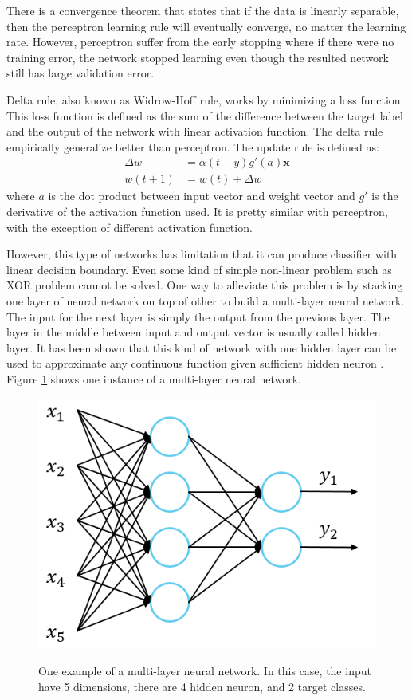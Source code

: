 \documentclass[a4paper,11pt]{kth-mag}
\begin{document}
There is a convergence theorem that states that if the data is linearly separable, then the perceptron learning rule will eventually converge, no matter the learning rate. However, perceptron suffer from the early stopping where if there were no training error, the network stopped learning even though the resulted network still has large validation error.

Delta rule, also known as Widrow-Hoff rule, works by minimizing a loss function. This loss function is defined as the sum of the difference between the target label and the output of the network with linear activation function. The delta rule empirically generalize better than perceptron. The update rule is defined as:
\begin{equation}
\begin{split}
\Delta w & = \alpha (t-y) g'(a) \bm{x} \\
w(t+1) & = w(t) + \Delta w
\end{split}
\end{equation}
where $a$ is the dot product between input vector and weight vector and $g'$ is the derivative of the activation function used. It is pretty similar with perceptron, with the exception of different activation function.

However, this type of networks has limitation that it can produce classifier with linear decision boundary. Even some kind of simple non-linear problem such as XOR problem cannot be solved. One way to alleviate this problem is by stacking one layer of neural network on top of other to build a multi-layer neural network. The input for the next layer is simply the output from the previous layer. The layer in the middle between input and output vector is usually called hidden layer. It has been shown that this kind of network with one hidden layer can be used to approximate any continuous function given sufficient hidden neuron \cite{cybenko1989}. Figure \ref{fig:multilayer} shows one instance of a multi-layer neural network.

\begin{figure}[h]
\centering
\includegraphics[scale=0.4]{image/multilayer.png}
\label{fig:multilayer}
\caption{One example of a multi-layer neural network. In this case, the input have 5 dimensions, there are 4 hidden neuron, and 2 target classes.}
\end{figure}
\end{document}
